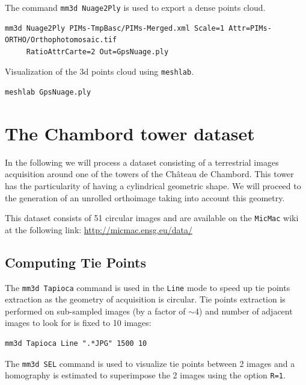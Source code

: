 The command {\tt mm3d Nuage2Ply} is used to export a dense points cloud.
\begin{verbatim}
mm3d Nuage2Ply PIMs-TmpBasc/PIMs-Merged.xml Scale=1 Attr=PIMs-ORTHO/Orthophotomosaic.tif 
     RatioAttrCarte=2 Out=GpsNuage.ply
\end{verbatim}

Visualization of the 3d points cloud using {\tt meshlab}.
\begin{verbatim}
meshlab GpsNuage.ply
\end{verbatim}


\section{The Chambord tower dataset}


In the following we will process a dataset consisting of a terrestrial images acquisition around one of the towers of the Ch\^{a}teau de Chambord. This tower has the particularity of having a cylindrical geometric shape. We will proceed to the generation of an unrolled orthoimage taking into account this geometry.\newline

This dataset consists of 51 circular images and are available on the {\tt MicMac} wiki at the following link: \url{http://micmac.ensg.eu/data/}

\subsection{Computing Tie Points}
The {\tt mm3d Tapioca} command is used in the {\tt Line} mode to speed up tie points extraction as the geometry of acquisition is circular. Tie points extraction is performed on sub-sampled images (by a factor of $\sim$4) and number of adjacent images to look for is fixed to 10 images:

\begin{verbatim}
mm3d Tapioca Line ".*JPG" 1500 10
\end{verbatim}

The {\tt mm3d SEL} command is used to visualize tie points between 2 images and a homography is estimated to superimpose the 2 images using the option {\tt R=1}. 


